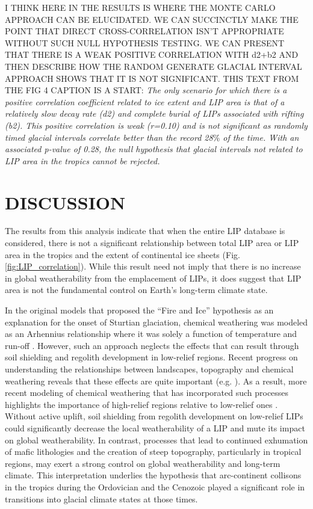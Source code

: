 \documentclass[11pt,letterpaper]{article}
\begin{document}
I THINK HERE IN THE RESULTS IS WHERE THE MONTE CARLO APPROACH CAN BE ELUCIDATED. WE CAN SUCCINCTLY MAKE THE POINT THAT DIRECT CROSS-CORRELATION ISN'T APPROPRIATE WITHOUT SUCH NULL HYPOTHESIS TESTING. WE CAN PRESENT THAT THERE IS A WEAK POSITIVE CORRELATION WITH d2+b2 AND THEN DESCRIBE HOW THE RANDOM GENERATE GLACIAL INTERVAL APPROACH SHOWS THAT IT IS NOT SIGNIFICANT. THIS TEXT FROM THE FIG 4 CAPTION IS A START:
\textit{The only scenario for which there is a positive correlation coefficient related to ice extent and LIP area is that of a relatively slow decay rate (d2) and complete burial of LIPs associated with rifting (b2). This positive correlation is weak (\textit{r}=0.10) and is not significant as randomly timed glacial intervals correlate better than the record 28$\%$ of the time. With an associated p-value of 0.28, the null hypothesis that glacial intervals not related to LIP area in the tropics cannot be rejected.}

\section*{DISCUSSION}

The results from this analysis indicate that when the entire LIP database is considered, there is not a significant relationship between total LIP area or LIP area in the tropics and the extent of continental ice sheets (Fig. \ref{fig:LIP_correlation}). While this result need not imply that there is no increase in global weatherability from the emplacement of LIPs, it does suggest that LIP area is not the fundamental control on Earth's long-term climate state.

In the original models that proposed the ``Fire and Ice'' hypothesis as an explanation for the onset of Sturtian glaciation, chemical weathering was modeled as an Arhennius relationship where it was solely a function of temperature and run-off \citep{Donnadieu2004a}. However, such an approach neglects the effects that can result through soil shielding and regolith development in low-relief regions. Recent progress on understanding the relationships between landscapes, topography and chemical weathering reveals that these effects are quite important (e.g. \citealp{Maher2014a}). As a result, more recent modeling of chemical weathering that has incorporated such processes highlights the importance of high-relief regions relative to low-relief ones \citep{Godderis2017b}. Without active uplift, soil shielding from regolith development on low-relief LIPs could significantly decrease the local weatherability of a LIP and mute its impact on global weatherability. In contrast, processes that lead to continued exhumation of mafic lithologies and the creation of steep topography, particularly in tropical regions, may exert a strong control on global weatherability and long-term climate. This interpretation underlies the hypothesis that arc-continent collisons in the tropics during the Ordovician \citep{Swanson-Hysell2017a} and the Cenozoic \citep{Jagoutz2016a} played a significant role in transitions into glacial climate states at those times.
\end{document}
